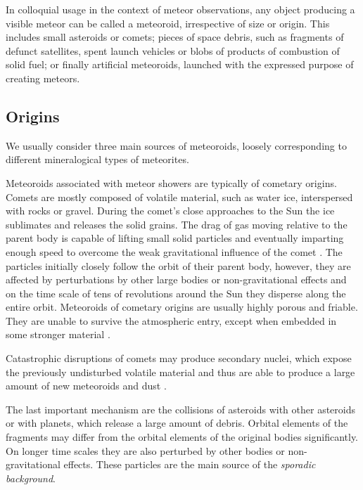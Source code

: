         In colloquial usage in the context of meteor observations, any object producing a visible meteor can be called a meteoroid,
        irrespective of size or origin. This includes small asteroids or comets; pieces of space debris,
        such as fragments of defunct satellites, spent launch vehicles or blobs of products of combustion of solid fuel;
        or finally artificial meteoroids, launched with the expressed purpose of creating meteors.

        \subsection{Origins} \label{iamo}
            We usually consider three main sources of meteoroids, loosely corresponding to different
            mineralogical types of meteorites.

            Meteoroids associated with meteor showers are typically of cometary origins.
            Comets are mostly composed of volatile material, such as water ice, interspersed
            with rocks or gravel. During the comet's close approaches to the Sun the ice sublimates
            and releases the solid grains. The drag of gas moving relative to the parent body
            is capable of lifting small solid particles and eventually imparting enough speed
            to overcome the weak gravitational influence of the comet \citep{whipple1951}.
            The particles initially closely follow the orbit of their parent body,
            however, they are affected by perturbations by other large bodies or non-gravitational effects
            and on the time scale of tens of revolutions around the Sun they disperse along the entire orbit.
            Meteoroids of cometary origins are usually highly porous and friable.
            They are unable to survive the atmospheric entry, except when embedded in some stronger material \citep{nittler+2019}.

            Catastrophic disruptions of comets may produce secondary nuclei, which expose
            the previously undisturbed volatile material and thus are able to produce
            a large amount of new meteoroids and dust \citep{jenniskens2006}.

            The last important mechanism are the collisions of asteroids with other asteroids
            or with planets, which release a large amount of debris. Orbital elements of the fragments
            may differ from the orbital elements of the original bodies significantly.
            On longer time scales they are also perturbed by other bodies or non-gravitational effects.
            These particles are the main source of the \emph{sporadic background}.

